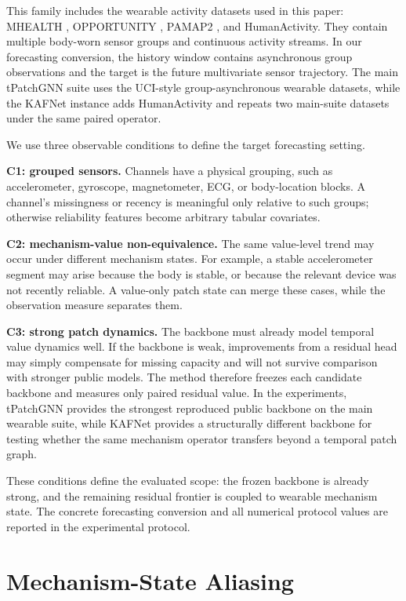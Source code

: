 ﻿\documentclass[10pt,conference]{IEEEtran}
\newcommand{\baseT}{\textnormal{\mbox{tPatchGNN}}}
\newcommand{\baseK}{\textnormal{\mbox{KAFNet}}}
\begin{document}
This family includes the wearable activity datasets used in this paper:
MHEALTH \cite{mhealth}, OPPORTUNITY \cite{opportunity}, PAMAP2
\cite{pamap2}, and HumanActivity.  They contain multiple body-worn sensor
groups and continuous activity streams.  In our forecasting conversion, the
history window contains asynchronous group observations and the target is the
future multivariate sensor trajectory.  The main \baseT{} suite uses the
UCI-style group-asynchronous wearable datasets, while the \baseK{} instance
adds HumanActivity and repeats two main-suite datasets under the same paired
operator.

We use three observable conditions to define the target forecasting setting.

\textbf{C1: grouped sensors.}
Channels have a physical grouping, such as accelerometer, gyroscope,
magnetometer, ECG, or body-location blocks.  A channel's missingness or
recency is meaningful only relative to such groups; otherwise reliability
features become arbitrary tabular covariates.

\textbf{C2: mechanism-value non-equivalence.}
The same value-level trend may occur under different mechanism states.  For
example, a stable accelerometer segment may arise because the body is stable,
or because the relevant device was not recently reliable.  A value-only patch
state can merge these cases, while the observation measure separates them.

\textbf{C3: strong patch dynamics.}
The backbone must already model temporal value dynamics well.  If the backbone
is weak, improvements from a residual head may simply compensate for missing
capacity and will not survive comparison with stronger public models.  The
method therefore freezes each candidate backbone and measures only paired
residual value.  In the experiments, \baseT{} provides the strongest reproduced
public backbone on the main wearable suite, while \baseK{} provides a
structurally different backbone for testing whether the same mechanism operator
transfers beyond a temporal patch graph.

These conditions define the evaluated scope: the frozen backbone is already
strong, and the remaining residual frontier is coupled to wearable mechanism
state.
The concrete forecasting conversion and all numerical protocol values are
reported in the experimental protocol.

\section{Mechanism-State Aliasing}
\end{document}

